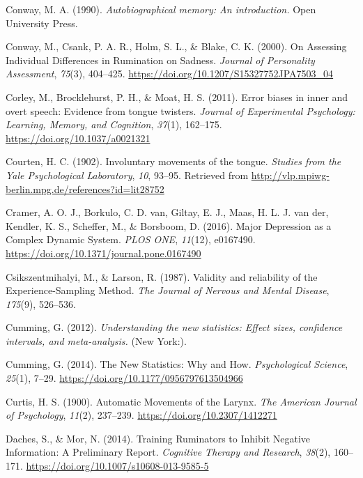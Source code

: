 \documentclass[a4paper,12pt,twoside,onecolumn,openright,final,oldfontcommands]{memoir}
\begin{document}
\leavevmode\hypertarget{ref-conway_autobiographical_1990}{}%
Conway, M. A. (1990). \emph{Autobiographical memory: An introduction.} Open University Press.

\leavevmode\hypertarget{ref-conway_assessing_2000}{}%
Conway, M., Csank, P. A. R., Holm, S. L., \& Blake, C. K. (2000). On Assessing Individual Differences in Rumination on Sadness. \emph{Journal of Personality Assessment}, \emph{75}(3), 404--425. \url{https://doi.org/10.1207/S15327752JPA7503_04}

\leavevmode\hypertarget{ref-corley_error_2011}{}%
Corley, M., Brocklehurst, P. H., \& Moat, H. S. (2011). Error biases in inner and overt speech: Evidence from tongue twisters. \emph{Journal of Experimental Psychology: Learning, Memory, and Cognition}, \emph{37}(1), 162--175. \url{https://doi.org/10.1037/a0021321}

\leavevmode\hypertarget{ref-courten_involuntary_1902}{}%
Courten, H. C. (1902). Involuntary movements of the tongue. \emph{Studies from the Yale Psychological Laboratory}, \emph{10}, 93--95. Retrieved from \url{http://vlp.mpiwg-berlin.mpg.de/references?id=lit28752}

\leavevmode\hypertarget{ref-cramer_major_2016}{}%
Cramer, A. O. J., Borkulo, C. D. van, Giltay, E. J., Maas, H. L. J. van der, Kendler, K. S., Scheffer, M., \& Borsboom, D. (2016). Major Depression as a Complex Dynamic System. \emph{PLOS ONE}, \emph{11}(12), e0167490. \url{https://doi.org/10.1371/journal.pone.0167490}

\leavevmode\hypertarget{ref-csikszentmihalyi_validity_1987}{}%
Csikszentmihalyi, M., \& Larson, R. (1987). Validity and reliability of the Experience-Sampling Method. \emph{The Journal of Nervous and Mental Disease}, \emph{175}(9), 526--536.

\leavevmode\hypertarget{ref-Cumming2012}{}%
Cumming, G. (2012). \emph{Understanding the new statistics: Effect sizes, confidence intervals, and meta-analysis.} (New York:).

\leavevmode\hypertarget{ref-cumming_new_2014}{}%
Cumming, G. (2014). The New Statistics: Why and How. \emph{Psychological Science}, \emph{25}(1), 7--29. \url{https://doi.org/10.1177/0956797613504966}

\leavevmode\hypertarget{ref-curtis_automatic_1900}{}%
Curtis, H. S. (1900). Automatic Movements of the Larynx. \emph{The American Journal of Psychology}, \emph{11}(2), 237--239. \url{https://doi.org/10.2307/1412271}

\leavevmode\hypertarget{ref-daches_training_2014}{}%
Daches, S., \& Mor, N. (2014). Training Ruminators to Inhibit Negative Information: A Preliminary Report. \emph{Cognitive Therapy and Research}, \emph{38}(2), 160--171. \url{https://doi.org/10.1007/s10608-013-9585-5}
\end{document}
